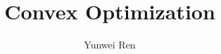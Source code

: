 

\title{Convex Optimization}
\author{Yunwei Ren}
\date{}


\maketitle
\tableofcontents

\newpage
\setcounter{section}{1}




